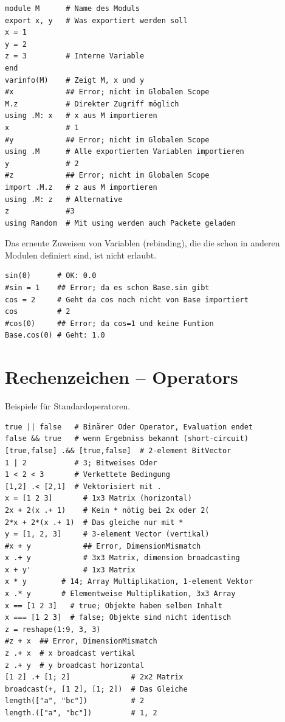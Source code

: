 \documentclass[10pt,twocolumn]{scrartcl}
\begin{document}
\begin{lstlisting}
module M      # Name des Moduls
export x, y   # Was exportiert werden soll
x = 1
y = 2
z = 3         # Interne Variable
end
varinfo(M)    # Zeigt M, x und y
#x            ## Error; nicht im Globalen Scope
M.z           # Direkter Zugriff möglich
using .M: x   # x aus M importieren
x             # 1
#y            ## Error; nicht im Globalen Scope
using .M      # Alle exportierten Variablen importieren
y             # 2
#z            ## Error; nicht im Globalen Scope
import .M.z   # z aus M importieren
using .M: z   # Alternative
z             #3
using Random  # Mit using werden auch Packete geladen
\end{lstlisting}


Das erneute Zuweisen von Variablen (rebinding), die die schon in anderen Modulen
definiert sind, ist nicht erlaubt.

\begin{lstlisting}
sin(0)      # OK: 0.0
#sin = 1    ## Error; da es schon Base.sin gibt
cos = 2     # Geht da cos noch nicht von Base importiert
cos         # 2
#cos(0)     ## Error; da cos=1 und keine Funtion
Base.cos(0) # Geht: 1.0
\end{lstlisting}

\section{Rechenzeichen -- Operators}
\label{sec:operatoren}

Beispiele für Standardoperatoren.

\begin{lstlisting}
true || false   # Binärer Oder Operator, Evaluation endet
false && true   # wenn Ergebniss bekannt (short-circuit)
[true,false] .&& [true,false]  # 2-element BitVector
1 | 2           # 3; Bitweises Oder
1 < 2 < 3       # Verkettete Bedingung
[1,2] .< [2,1]  # Vektorisiert mit .
x = [1 2 3]       # 1x3 Matrix (horizontal)
2x + 2(x .+ 1)    # Kein * nötig bei 2x oder 2(
2*x + 2*(x .+ 1)  # Das gleiche nur mit *
y = [1, 2, 3]     # 3-element Vector (vertikal)
#x + y            ## Error, DimensionMismatch
x .+ y            # 3x3 Matrix, dimension broadcasting
x + y'            # 1x3 Matrix
x * y        # 14; Array Multiplikation, 1-element Vektor
x .* y       # Elementweise Multiplikation, 3x3 Array
x == [1 2 3]   # true; Objekte haben selben Inhalt
x === [1 2 3]  # false; Objekte sind nicht identisch
z = reshape(1:9, 3, 3)
#z + x  ## Error, DimensionMismatch
z .+ x  # x broadcast vertikal
z .+ y  # y broadcast horizontal
[1 2] .+ [1; 2]              # 2x2 Matrix
broadcast(+, [1 2], [1; 2])  # Das Gleiche
length(["a", "bc"])          # 2
length.(["a", "bc"])         # 1, 2
\end{lstlisting}
\end{document}
